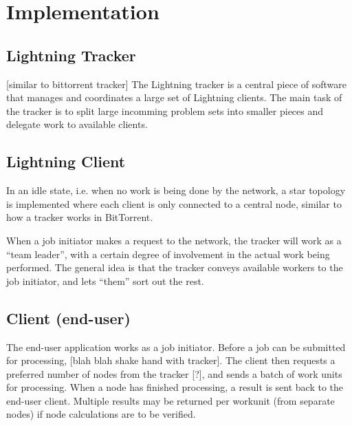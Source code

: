 \chapter{Implementation}
 
\section{Lightning Tracker}
[similar to bittorrent tracker]
The Lightning tracker is a central piece of software that manages and coordinates a large set
of Lightning clients. The main task of the tracker is to split large incomming problem sets into smaller pieces and delegate work to available clients.

\section{Lightning Client}
In an idle state, i.e. when no work is being done by the network, a star topology is implemented where each client is only connected to a central node, similar to how a tracker works in BitTorrent.

When a job initiator makes a request to the network, the tracker will work as a “team leader”,  with a certain degree of involvement in the actual work being performed. The general idea is that the tracker conveys available workers to the job initiator, and lets “them” sort out the rest.


\section{Client (end-user)}
The end-user application works as a job initiator. Before a job can be submitted for processing, [blah blah shake hand with tracker]. The client then requests a preferred number of nodes from the tracker [?], and sends a batch of work units for processing. When a node has finished processing, a result is sent back to the end-user client. Multiple results may be returned per workunit (from separate nodes) if node calculations are to be verified.